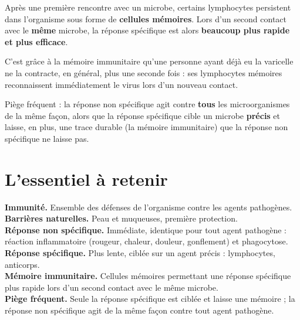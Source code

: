 \begin{propriete}
Après une première rencontre avec un microbe, certains lymphocytes persistent dans
l'organisme sous forme de \textbf{cellules mémoires}. Lors d'un second contact avec le
\textbf{même} microbe, la réponse spécifique est alors \textbf{beaucoup plus rapide et
plus efficace}.
\end{propriete}

\begin{exemple}
C'est grâce à la mémoire immunitaire qu'une personne ayant déjà eu la varicelle ne la
contracte, en général, plus une seconde fois : ses lymphocytes mémoires reconnaissent
immédiatement le virus lors d'un nouveau contact.
\end{exemple}

\begin{remarque}
Piège fréquent : la réponse non spécifique agit contre \textbf{tous} les
microorganismes de la même façon, alors que la réponse spécifique cible un microbe
\textbf{précis} et laisse, en plus, une trace durable (la mémoire immunitaire) que la
réponse non spécifique ne laisse pas.
\end{remarque}

\section{L'essentiel à retenir}

\begin{synthese}
\textbf{Immunité.} Ensemble des défenses de l'organisme contre les agents
pathogènes.\\[4pt]
\textbf{Barrières naturelles.} Peau et muqueuses, première protection.\\[4pt]
\textbf{Réponse non spécifique.} Immédiate, identique pour tout agent pathogène :
réaction inflammatoire (rougeur, chaleur, douleur, gonflement) et phagocytose.\\[4pt]
\textbf{Réponse spécifique.} Plus lente, ciblée sur un agent précis : lymphocytes,
anticorps.\\[4pt]
\textbf{Mémoire immunitaire.} Cellules mémoires permettant une réponse spécifique plus
rapide lors d'un second contact avec le même microbe.\\[4pt]
\textbf{Piège fréquent.} Seule la réponse spécifique est ciblée et laisse une mémoire ;
la réponse non spécifique agit de la même façon contre tout agent pathogène.
\end{synthese}

